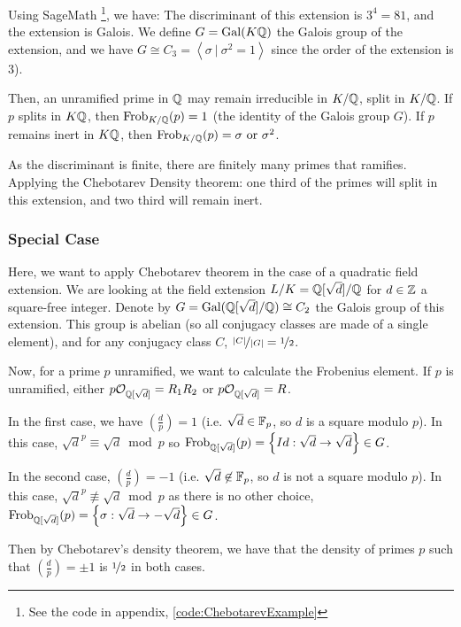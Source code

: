 Using SageMath \footnote{See the code in appendix, \ref{code:ChebotarevExample}}, we have:
The discriminant of this extension is $3^4=81$, and the extension is Galois.
We define $G = \text{Gal}(K\mathbb{Q})$ the Galois group of the extension, and we have $G \cong C_3 = \left\langle \sigma \ | \ \sigma^2 = 1 \right\rangle $ since the order of the extension is 3).

Then, an unramified prime in $\mathbb{Q}$ may remain irreducible in $K/\mathbb{Q}$, split in $K/\mathbb{Q}$.
If $p$ splits in $K\mathbb{Q}$, then $\text{Frob}_{K/\mathbb{Q}}(p)=1$ (the identity of the Galois group $G$).
If $p$ remains inert in $K\mathbb{Q}$, then $\text{Frob}_{K/\mathbb{Q}}(p)=\sigma \text{ or } \sigma^2$.

As the discriminant is finite, there are finitely many primes that ramifies.
Applying the Chebotarev Density theorem: one third of the primes will split in this extension, and two third will remain inert.

\subsubsection{Special Case}
Here, we want to apply Chebotarev theorem in the case of a quadratic field extension.
We are looking at the field extension $L/K = \mathbb{Q}[\sqrt{d}]/\mathbb{Q}$ for $d \in \mathbb{Z}$ a square-free integer.
Denote by $G = \text{Gal}(\mathbb{Q}[\sqrt{d}]/\mathbb{Q}) \cong C_2$ the Galois group of this extension.
This group is abelian (so all conjugacy classes are made of a single element), and for any conjugacy class $C$, $\nicefrac{|C|}{|G|} = \nicefrac{1}{2}$.

Now, for a prime $p$ unramified, we want to calculate the Frobenius element.
If $p$ is unramified, either $p \mathcal{O}_{\mathbb{Q}[\sqrt{d}]} = R_1R_2$ or $p \mathcal{O}_{\mathbb{Q}[\sqrt{d}]} = R$.

In the first case, we have $\left( \frac{d}{p} \right) = 1$ (i.e. $\sqrt{d} \in \mathbb{F}_p$, so $d$ is a square modulo $p$).
In this case, $\sqrt{d}^p \equiv \sqrt{d} \bmod p$ so $\text{Frob}_{\mathbb{Q}[\sqrt{d}]}(p) = \left\lbrace Id: \sqrt{d} \to \sqrt{d} \right\rbrace \in G$.

In the second case, $\left( \frac{d}{p} \right) = -1$ (i.e. $\sqrt{d} \not\in \mathbb{F}_p$, so $d$ is not a square modulo $p$).
In this case, $\sqrt{d}^p \not\equiv \sqrt{d} \bmod p$ as there is no other choice, $\text{Frob}_{\mathbb{Q}[\sqrt{d}]}(p) = \left\lbrace \sigma: \sqrt{d} \to -\sqrt{d} \right\rbrace \in G$.

Then by Chebotarev's density theorem, we have that the density of primes $p$ such that $\left( \frac{d}{p} \right) = \pm1$ is $\nicefrac{1}{2}$ in both cases.

